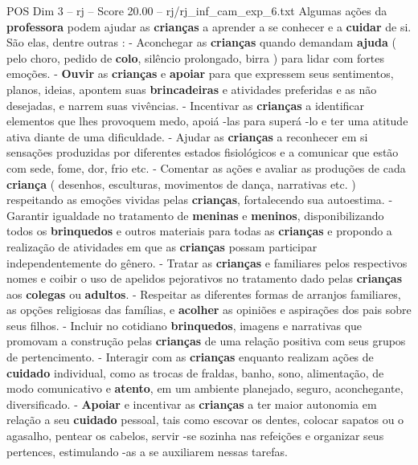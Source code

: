 \begin{textsample}{POS Dim 3 – rj – Score 20.00 – rj/rj\_inf\_cam\_exp\_6.txt}
Algumas ações da \textbf{professora} podem ajudar as \textbf{crianças} a aprender a se conhecer e a \textbf{cuidar} de si.
São elas, dentre outras : - Aconchegar as \textbf{crianças} quando demandam \textbf{ajuda} ( pelo choro, pedido de \textbf{colo}, silêncio prolongado, birra ) para lidar com fortes emoções. - \textbf{Ouvir} as \textbf{crianças} e \textbf{apoiar} para que expressem seus sentimentos, planos, ideias, apontem suas \textbf{brincadeiras} e atividades preferidas e as não desejadas, e narrem suas vivências. - Incentivar as \textbf{crianças} a identificar elementos que lhes provoquem medo, apoiá -las para superá -lo e ter uma atitude ativa diante de uma dificuldade. - Ajudar as \textbf{crianças} a reconhecer em si sensações produzidas por diferentes estados fisiológicos e a comunicar que estão com sede, fome, dor, frio etc. - Comentar as ações e avaliar as produções de cada \textbf{criança} ( desenhos, esculturas, movimentos de dança, narrativas etc. ) respeitando as emoções vividas pelas \textbf{crianças}, fortalecendo sua autoestima. - Garantir igualdade no tratamento de \textbf{meninas} e \textbf{meninos}, disponibilizando todos os \textbf{brinquedos} e outros materiais para todas as \textbf{crianças} e propondo a realização de atividades em que as \textbf{crianças} possam participar independentemente do gênero. - Tratar as \textbf{crianças} e familiares pelos respectivos nomes e coibir o uso de apelidos pejorativos no tratamento dado pelas \textbf{crianças} aos \textbf{colegas} ou \textbf{adultos}. - Respeitar as diferentes formas de arranjos familiares, as opções religiosas das famílias, e \textbf{acolher} as opiniões e aspirações dos pais sobre seus filhos. - Incluir no cotidiano \textbf{brinquedos}, imagens e narrativas que promovam a construção pelas \textbf{crianças} de uma relação positiva com seus grupos de pertencimento. - Interagir com as \textbf{crianças} enquanto realizam ações de \textbf{cuidado} individual, como as trocas de fraldas, banho, sono, alimentação, de modo comunicativo e \textbf{atento}, em um ambiente planejado, seguro, aconchegante, diversificado. - \textbf{Apoiar} e incentivar as \textbf{crianças} a ter maior autonomia em relação a seu \textbf{cuidado} pessoal, tais como escovar os dentes, colocar sapatos ou o agasalho, pentear os cabelos, servir -se sozinha nas refeições e organizar seus pertences, estimulando -as a se auxiliarem nessas tarefas.

\end{textsample}
